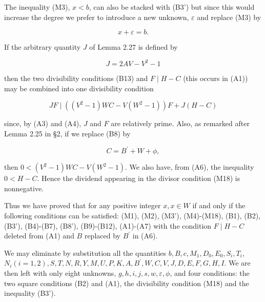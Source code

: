 \documentclass[11pt,a4paper]{article}
\begin{document}
The inequality (M3), $x<b$, can also be stacked with (B3') but since this would increase the degree we prefer to introduce a new unknown, $\varepsilon$ and replace (M3) by


\begin{equation*}
x+\varepsilon=b . \tag{M3'}
\end{equation*}


If the arbitrary quantity $J$ of Lemma 2.27 is defined by


\begin{equation*}
J=2 A V-V^{2}-1 \tag{M17}
\end{equation*}


then the two divisibility conditions (B13) and $F \mid H-C$ (this occurs in (A1)) may be combined into one divisibility condition


\begin{equation*}
J F \mid\left(\left(V^{2}-1\right) W C-V\left(W^{2}-1\right)\right) F+J(H-C) \tag{M18}
\end{equation*}


since, by (A3) and (A4), $J$ and $F$ are relatively prime. Also, as remarked after Lemma 2.25 in §2, if we replace (B8) by


\begin{equation*}
C=B^{\prime}+W+\phi, \tag{B8'}
\end{equation*}


then $0<\left(V^{2}-1\right) W C-V\left(W^{2}-1\right)$. We also have, from (A6), the inequality $0<H-C$. Hence the dividend appearing in the divisor condition (M18) is nonnegative.

Thus we have proved that for any positive integer $x,\allowbreak  x \in W$ if and only if the following conditions can be satisfied: (M1), (M2), (M3'), (M4)-(M18), (B1), (B2), (B3'), (B4)-(B7), (B8'), (B9)-(B12), (A1)-(A7) with the condition $F \mid H-C$ deleted from (A1) and $B$ replaced by $B^{\prime}$ in (A6).

We may eliminate by substitution all the quantities $b,\allowbreak  B,\allowbreak  c,\allowbreak  M_{1},\allowbreak  D_{0},\allowbreak  E_{0},\allowbreak  S_{i},\allowbreak  T_{i}$, $N_{i}(i=1,\allowbreak 2),\allowbreak  S,\allowbreak  T,\allowbreak  N,\allowbreak  R,\allowbreak  Y,\allowbreak  M,\allowbreak  U,\allowbreak  P,\allowbreak  K,\allowbreak  A,\allowbreak  B^{\prime},\allowbreak  W,\allowbreak  C,\allowbreak  V,\allowbreak  J,\allowbreak  D,\allowbreak  E,\allowbreak  F,\allowbreak  G,\allowbreak  H,\allowbreak  I$. We are then left with only eight unknowns, $g,\allowbreak  h,\allowbreak  i,\allowbreak  j,\allowbreak  s,\allowbreak  w,\allowbreak  \varepsilon,\allowbreak  \phi$, and four conditions: the two square conditions (B2) and (A1), the divisibility condition (M18) and the inequality (B3').
\end{document}
